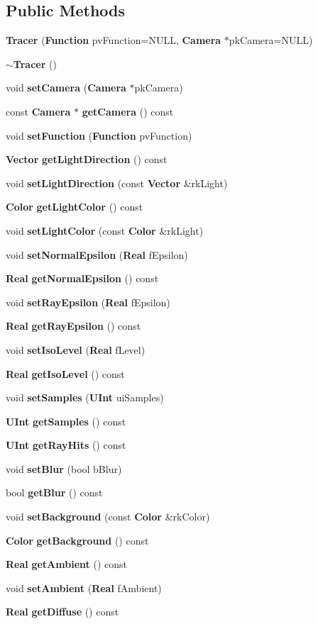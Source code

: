 \subsection*{Public Methods}
\begin{CompactItemize}
\item 
{\bf Tracer} ({\bf Function} pv\-Function=NULL, {\bf Camera} $\ast$pk\-Camera=NULL)
\item 
{\bf $\sim$Tracer} ()
\item 
void {\bf set\-Camera} ({\bf Camera} $\ast$pk\-Camera)
\item 
const {\bf Camera} $\ast$ {\bf get\-Camera} () const
\item 
void {\bf set\-Function} ({\bf Function} pv\-Function)
\item 
{\bf Vector} {\bf get\-Light\-Direction} () const
\item 
void {\bf set\-Light\-Direction} (const {\bf Vector} \&rk\-Light)
\item 
{\bf Color} {\bf get\-Light\-Color} () const
\item 
void {\bf set\-Light\-Color} (const {\bf Color} \&rk\-Light)
\item 
void {\bf set\-Normal\-Epsilon} ({\bf Real} f\-Epsilon)
\item 
{\bf Real} {\bf get\-Normal\-Epsilon} () const
\item 
void {\bf set\-Ray\-Epsilon} ({\bf Real} f\-Epsilon)
\item 
{\bf Real} {\bf get\-Ray\-Epsilon} () const
\item 
void {\bf set\-Iso\-Level} ({\bf Real} f\-Level)
\item 
{\bf Real} {\bf get\-Iso\-Level} () const
\item 
void {\bf set\-Samples} ({\bf UInt} ui\-Samples)
\item 
{\bf UInt} {\bf get\-Samples} () const
\item 
{\bf UInt} {\bf get\-Ray\-Hits} () const
\item 
void {\bf set\-Blur} (bool b\-Blur)
\item 
bool {\bf get\-Blur} () const
\item 
void {\bf set\-Background} (const {\bf Color} \&rk\-Color)
\item 
{\bf Color} {\bf get\-Background} () const
\item 
{\bf Real} {\bf get\-Ambient} () const
\item 
void {\bf set\-Ambient} ({\bf Real} f\-Ambient)
\item 
{\bf Real} {\bf get\-Diffuse} () const

\end{CompactItemize}
